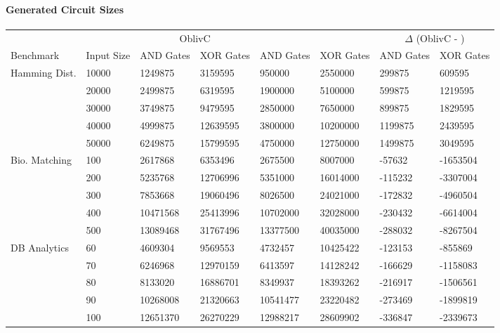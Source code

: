 \paragraph{Generated Circuit Sizes}

\begin{table}
  \centering
  \smaller
\begin{tabular}{ l l l l l l l l }
\hline \hline
& & \multicolumn{2}{c}{OblivC} & \multicolumn{2}{c}{\system{}} & \multicolumn{2}{c}{$\Delta$ (OblivC - \system{})} \\
\cmidrule(lr){3-4} \cmidrule(lr){5-6} \cmidrule(l){7-8}
Benchmark & Input Size & AND Gates & XOR Gates & AND Gates & XOR Gates & AND Gates & XOR Gates \\
\hline
Hamming Dist. & 10000 & 1249875  & 3159595  & 950000   & 2550000  & 299875  & 609595   \\
              & 20000 & 2499875  & 6319595  & 1900000  & 5100000  & 599875  & 1219595  \\
              & 30000 & 3749875  & 9479595  & 2850000  & 7650000  & 899875  & 1829595  \\
              & 40000 & 4999875  & 12639595 & 3800000  & 10200000 & 1199875 & 2439595  \\
              & 50000 & 6249875  & 15799595 & 4750000  & 12750000 & 1499875 & 3049595  \\
\hline
Bio. Matching & 100   & 2617868  & 6353496  & 2675500  & 8007000  & -57632  & -1653504 \\
              & 200   & 5235768  & 12706996 & 5351000  & 16014000 & -115232 & -3307004 \\
              & 300   & 7853668  & 19060496 & 8026500  & 24021000 & -172832 & -4960504 \\
              & 400   & 10471568 & 25413996 & 10702000 & 32028000 & -230432 & -6614004 \\
              & 500   & 13089468 & 31767496 & 13377500 & 40035000 & -288032 & -8267504 \\
\hline
DB Analytics  & 60    & 4609304  & 9569553  & 4732457  & 10425422 & -123153 & -855869  \\
              & 70    & 6246968  & 12970159 & 6413597  & 14128242 & -166629 & -1158083 \\
              & 80    & 8133020  & 16886701 & 8349937  & 18393262 & -216917 & -1506561 \\
              & 90    & 10268008 & 21320663 & 10541477 & 23220482 & -273469 & -1899819 \\
              & 100   & 12651370 & 26270229 & 12988217 & 28609902 & -336847 & -2339673 \\

\end{tabular}
\end{table}
